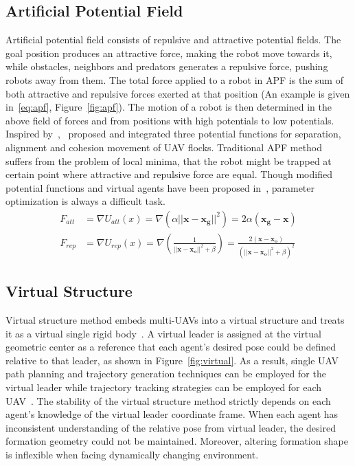 \subsection{Artificial Potential Field}
Artificial potential field consists of repulsive and attractive potential fields. The goal position produces an attractive force, making the robot move towards it, while obstacles, neighbors and predators generates a repulsive force, pushing robots away from them. The total force applied to a robot in APF is the sum of both attractive and repulsive forces exerted at that position (An example is given in~\ref{eq:apf}, Figure~\ref{fig:apf}). The motion of a robot is then determined in the above field of forces and from positions with high potentials to low potentials. Inspired by~\cite{Reynolds1987},~\cite{Martin2014} proposed and integrated three potential functions for separation, alignment and cohesion movement of UAV flocks. Traditional APF method suffers from the problem of local minima, that the robot might be trapped at certain point where attractive and repulsive force are equal. Though modified potential functions and virtual agents have been proposed in~\cite{Saber2006}, parameter optimization is always a difficult task.
\begin{equation}\label{eq:apf}
\begin{aligned}
F_{att}&=\nabla U_{att}(x)=\nabla(\alpha||\mathbf{x}-\mathbf{x_g}||^2)=2\alpha(\mathbf{x_g}-\mathbf{x})\\
F_{rep}&=\nabla U_{rep}(x)=\nabla(\frac{1}{||\mathbf{x}-\mathbf{x_o}||^2+\beta})=\frac{2(\mathbf{x}-\mathbf{x_o})}{(||\mathbf{x}-\mathbf{x_o}||^2+\beta)^2}
\end{aligned}
\end{equation}

\subsection{Virtual Structure}
Virtual structure method embeds multi-UAVs into a virtual structure and treats it as a virtual single rigid body~\cite{Virtual2008}. A virtual leader is assigned at the virtual geometric center as a reference that each agent's desired pose could be defined relative to that leader, as shown in Figure~\ref{fig:virtual}. As a result, single UAV path planning and trajectory generation techniques can be employed for the virtual leader while trajectory tracking strategies can be employed for each UAV~\cite{Askari2015}. The stability of the virtual structure method strictly depends on each agent's knowledge of the virtual leader coordinate frame. When each agent has inconsistent understanding of the relative pose from virtual leader, the desired formation geometry could not be maintained. Moreover, altering formation shape is inflexible when facing dynamically changing environment.

